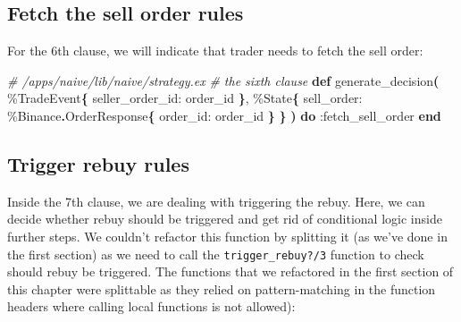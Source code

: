 \documentclass[
  oneside]{book}
\newenvironment{Shaded}{\begin{snugshade}}{\end{snugshade}}
\newcommand{\CommentTok}[1]{\textcolor[rgb]{0.56,0.35,0.01}{\textit{#1}}}
\newcommand{\ConstantTok}[1]{\textcolor[rgb]{0.56,0.35,0.01}{#1}}
\newcommand{\FunctionTok}[1]{\textcolor[rgb]{0.13,0.29,0.53}{\textbf{#1}}}
\newcommand{\KeywordTok}[1]{\textcolor[rgb]{0.13,0.29,0.53}{\textbf{#1}}}
\newcommand{\NormalTok}[1]{#1}
\newcommand{\OperatorTok}[1]{\textcolor[rgb]{0.81,0.36,0.00}{\textbf{#1}}}
\newcommand{\VariableTok}[1]{\textcolor[rgb]{0.00,0.00,0.00}{#1}}
\begin{document}
\subsection{Fetch the sell order rules}\label{fetch-the-sell-order-rules}

For the 6th clause, we will indicate that trader needs to fetch the sell order:

\begin{Shaded}
\begin{Highlighting}[]
\CommentTok{\# /apps/naive/lib/naive/strategy.ex}
\CommentTok{\# the sixth clause}
  \KeywordTok{def}\NormalTok{ generate\_decision}\FunctionTok{(}
\NormalTok{        \%}\ConstantTok{TradeEvent}\FunctionTok{\{}
          \VariableTok{seller\_order\_id:}\NormalTok{ order\_id}
        \FunctionTok{\}}\NormalTok{,}
\NormalTok{        \%}\ConstantTok{State}\FunctionTok{\{}
          \VariableTok{sell\_order:}\NormalTok{ \%}\ConstantTok{Binance}\OperatorTok{.}\ConstantTok{OrderResponse}\FunctionTok{\{}
            \VariableTok{order\_id:}\NormalTok{ order\_id}
          \FunctionTok{\}}
        \FunctionTok{\}}
      \FunctionTok{)} \KeywordTok{do}
    \VariableTok{:fetch\_sell\_order}
  \KeywordTok{end}
\end{Highlighting}
\end{Shaded}

\subsection{Trigger rebuy rules}\label{trigger-rebuy-rules}

Inside the 7th clause, we are dealing with triggering the rebuy. Here, we can decide whether rebuy should be triggered and get rid of conditional logic inside further steps. We couldn't refactor this function by splitting it (as we've done in the first section) as we need to call the \texttt{trigger\_rebuy?/3} function to check should rebuy be triggered. The functions that we refactored in the first section of this chapter were splittable as they relied on pattern-matching in the function headers where calling local functions is not allowed):
\end{document}
